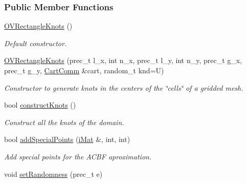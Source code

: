 \subsubsection*{Public Member Functions}
\begin{CompactItemize}
\item 
\hypertarget{classOVRectangleKnots_7c992c0a0badca8904ff6154efbdd3cd}{
\hyperlink{classOVRectangleKnots_7c992c0a0badca8904ff6154efbdd3cd}{OVRectangleKnots} ()}
\label{classOVRectangleKnots_7c992c0a0badca8904ff6154efbdd3cd}

\begin{CompactList}\small\item\em Default constructor. \item\end{CompactList}\item 
\hyperlink{classOVRectangleKnots_c0e262d3c093c9b4c3fc74ff126cce99}{OVRectangleKnots} (prec\_\-t l\_\-x, int n\_\-x, prec\_\-t l\_\-y, int n\_\-y, prec\_\-t g\_\-x, prec\_\-t g\_\-y, \hyperlink{classCartComm}{CartComm} \&cart, random\_\-t knd=U)
\begin{CompactList}\small\item\em Constructor to generate knots in the centers of the \char`\"{}cells\char`\"{} of a gridded mesh. \item\end{CompactList}\item 
bool \hyperlink{classOVRectangleKnots_57cd6386ac15fafdbcd2475c44f4397a}{constructKnots} ()
\begin{CompactList}\small\item\em Construct all the knots of the domain. \item\end{CompactList}\item 
bool \hyperlink{classOVRectangleKnots_6e4e215757508de77c9d915269a174b9}{addSpecialPoints} (\hyperlink{Traits_8hpp_a667f32088e1c93b532a640fe84dc4cd}{iMat} \&, int, int)
\begin{CompactList}\small\item\em Add special points for the ACBF aproximation. \item\end{CompactList}\item 
\hypertarget{classOVRectangleKnots_d0bc334d3263ec1e6839843d5438d718}{
void \hyperlink{classOVRectangleKnots_d0bc334d3263ec1e6839843d5438d718}{setRandomness} (prec\_\-t e)}
\label{classOVRectangleKnots_d0bc334d3263ec1e6839843d5438d718}


\end{CompactItemize}
